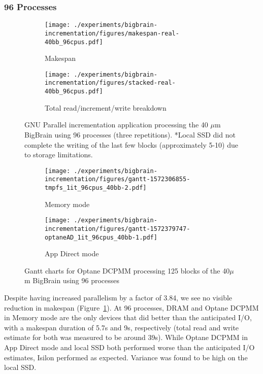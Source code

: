 \documentclass[conference]{IEEEtran}
\begin{document}
\subsubsection{96 Processes}

\begin{figure}
    \begin{subfigure}{\columnwidth}
        \centering
        \texttt{[image: ./experiments/bigbrain-incrementation/figures/makespan-real-40bb\_96cpus.pdf]}
        \caption{Makespan}\label{fig:makespan-96cpus}
    \end{subfigure}
    \begin{subfigure}{\columnwidth}
        \centering
        \texttt{[image: ./experiments/bigbrain-incrementation/figures/stacked-real-40bb\_96cpus.pdf]}
        \caption{Total read/increment/write breakdown}\label{fig:stacked-96cpus}
    \end{subfigure}
    \captionsetup{belowskip=-10pt}
    \caption{GNU Parallel incrementation application processing the 40 $\mu$m BigBrain using 96 processes (three repetitions). *Local SSD did not complete the
    writing of the last few blocks (approximately 5-10) due to storage limitations.}
\end{figure}

\begin{figure*}
    \begin{subfigure}{\columnwidth}
        \centering
    \texttt{[image: ./experiments/bigbrain-incrementation/figures/gantt-1572306855-tmpfs\_1it\_96cpus\_40bb-2.pdf]}
    \caption{Memory mode}
\end{subfigure}
\begin{subfigure}{\columnwidth}
        \centering
    \texttt{[image: ./experiments/bigbrain-incrementation/figures/gantt-1572379747-optaneAD\_1it\_96cpus\_40bb-1.pdf]}
    \caption{App Direct mode}
\end{subfigure}
    \captionsetup{belowskip=-10pt}
\caption{Gantt charts for Optane DCPMM processing 125 blocks of the 40$\mu$m BigBrain using 96 processes}\label{fig:gantt96}
\end{figure*}

Despite having increased parallelism by a factor of 3.84, we see no visible reduction
in makespan (Figure~\ref{fig:makespan-96cpus}). At 96 processes, DRAM and Optane DCPMM in Memory mode are the only devices that did better than the anticipated I/O, with a makespan duration of
5.7s and 9s, respectively (total read and write estimate for both was measured to be around 39s). While
Optane DCPMM in App Direct mode and local SSD both performed worse than the anticipated I/O estimates, Isilon
performed as expected. Variance was found to be high on the local SSD.
\end{document}
